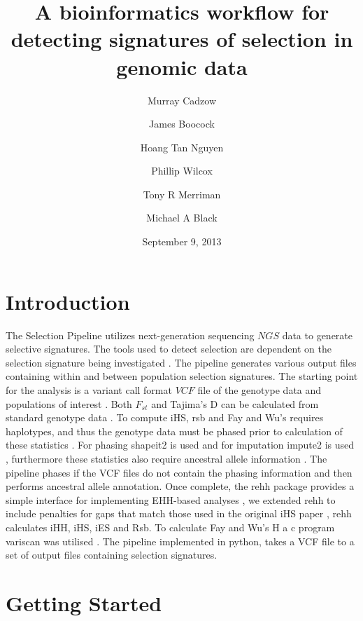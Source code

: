 \documentclass[a4paper,10pt]{article}
\title{\textbf{A bioinformatics workflow for detecting signatures of selection in genomic data}}
\date{September 9, 2013}
\author[1,2]{Murray Cadzow}
\author[1,2]{James Boocock}
\author[1,2]{Hoang Tan Nguyen}
\author[2,3]{Phillip Wilcox}
\author[1]{Tony R Merriman}
\author[1]{Michael A Black}
\affil[1]{Department of Biochemistry, University of Otago}
\affil[2]{Department of Mathematics and Statistics, University of Otago}
\affil[3]{Scion Research, Rotorua, New Zealand}
\begin{document}
\maketitle{}
\doublespacing
\tableofcontents
\section{Introduction}
The Selection Pipeline utilizes next-generation sequencing \(NGS\) data to generate selective signatures. The tools used to detect selection are dependent on the selection signature being investigated \citep{Sabeti:2006ha}. The pipeline generates various output files containing within and between population selection signatures. The starting point for the analysis is a variant call format \(VCF\) file of the genotype data and populations of interest \citep{Danecek:2011gz}. Both $F_{st}$ and Tajima's D can be calculated from standard genotype data \citep{Weir:1984vn} \citep{Tajima:1989un}. To compute iHS, rsb and Fay and Wu's requires haplotypes, and thus the genotype data must be phased prior to calculation of these statistics \citep{Voight:2006go} \citep{Gautier:2012et} \citep{fayandwush}. For phasing shapeit2 is used and for imputation impute2 is used \citep{impute22009} \citep{Delaneau:2013hi}, furthermore these statistics also require ancestral allele information \citep{Flicek:2012vg}.  The pipeline phases if the VCF files do not contain the phasing information and then performs ancestral allele annotation. Once complete, the rehh package provides a simple interface for implementing EHH-based analyses \citep{Gautier:2012et}, we extended rehh to include penalties for gaps that match those used in the original iHS paper \citep{Voight:2006go}, rehh calculates iHH, iHS, iES and Rsb. To calculate Fay and Wu's H a c program variscan was utilised \citep{variscan2005}. The pipeline implemented in python, takes a VCF file to a set of output files containing selection signatures.
\section{Getting Started}
\end{document}
